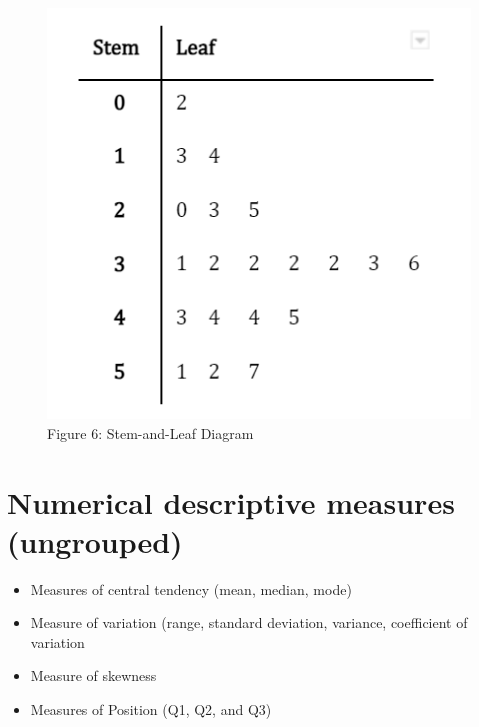 \documentclass[
  a4paper,
  DIV=11,
  numbers=noendperiod,
  oneside]{scrreprt}
\providecommand{\tightlist}{%
  \setlength{\itemsep}{0pt}\setlength{\parskip}{0pt}}\usepackage{longtable,booktabs,array}
\begin{document}
\begin{figure}

{\centering \includegraphics[width=5.20833in,height=\textheight]{images/ch2/picture8.png}

}

\caption{Figure 6: Stem-and-Leaf Diagram}

\end{figure}

\hypertarget{numerical-descriptive-measures-ungrouped}{%
\section{Numerical descriptive measures
(ungrouped)}\label{numerical-descriptive-measures-ungrouped}}

\begin{itemize}
\tightlist
\item
  Measures of central tendency (mean, median, mode)
\item
  Measure of variation (range, standard deviation, variance, coefficient
  of variation
\item
  Measure of skewness
\item
  Measures of Position (Q1, Q2, and Q3)
\end{itemize}
\end{document}
